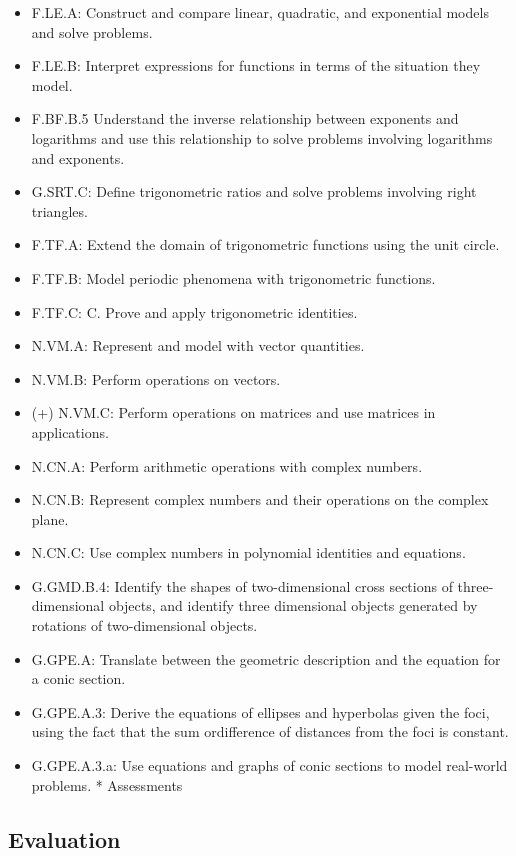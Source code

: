 \documentclass[12pt]{article}
\begin{document}
\begin{itemize}
\item F.LE.A: Construct and compare linear, quadratic, and exponential models and solve problems.
\item F.LE.B: Interpret expressions for functions in terms of the situation they model.
\item F.BF.B.5 Understand the inverse relationship between exponents and logarithms and use this relationship to solve problems involving logarithms and exponents.
\item G.SRT.C: Define trigonometric ratios and solve problems involving right triangles.
\item F.TF.A: Extend the domain of trigonometric functions using the unit circle.
\item F.TF.B: Model periodic phenomena with trigonometric functions. 
\item F.TF.C: C. Prove and apply trigonometric identities.
\item N.VM.A: Represent and model with vector quantities.
\item N.VM.B: Perform operations on vectors.
\item (+) N.VM.C: Perform operations on matrices and use matrices in applications.
\item N.CN.A: Perform arithmetic operations with complex numbers.
\item N.CN.B: Represent complex numbers and their operations on the complex plane.
\item N.CN.C: Use complex numbers in polynomial identities and equations.
\item G.GMD.B.4: Identify the shapes of two-dimensional cross sections of three-dimensional objects, and identify three dimensional objects generated by rotations of two-dimensional objects.
\item G.GPE.A: Translate between the geometric description and the equation for a conic section.
\item G.GPE.A.3: Derive the equations of ellipses and hyperbolas given the foci, using the fact that the sum ordifference of distances from the foci is constant.
\item G.GPE.A.3.a: Use equations and graphs of conic sections to model real-world problems.
* Assessments
\end{itemize}



\subsection*{Evaluation}
\end{document}

